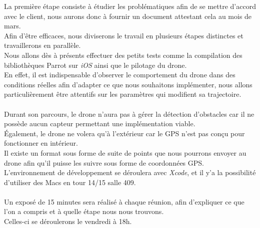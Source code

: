 \documentclass[]{article}
\begin{document}
La première étape consiste à étudier les problématiques afin de se mettre d'accord avec le client, nous aurons donc à fournir un document attestant cela au mois de mars. \\
Afin d'être efficaces, nous diviserons le travail en plusieurs étapes distinctes et travaillerons en parallèle.\\
Nous allons dès à présents effectuer des petits tests comme la compilation des bibliothèques Parrot sur \textit{iOS} ainsi que le pilotage du drone. \\
En effet, il est indispensable d'observer le comportement du drone dans des conditions réelles afin d'adapter ce que nous souhaitons implémenter, nous allons particulièrement être attentifs sur les paramètres qui modifient sa trajectoire. 
\\
\\
Durant son parcours, le drone n'aura pas à gérer la détection d'obstacles car il ne possède aucun capteur permettant une implémentation viable. \\
Également, le drone ne volera  qu'à l'extérieur car le GPS n'est pas conçu pour fonctionner en intérieur.\\
Il existe un format sous forme de suite de points que nous pourrons envoyer au drone afin qu'il puisse les suivre sous forme de coordonnées GPS.\\
L'environnement de développement se déroulera avec \textit{Xcode}, et il y'a la possibilité d'utiliser des Macs en tour 14/15 salle 409.\\
\\
Un exposé de 15 minutes sera réalisé à chaque réunion, afin d'expliquer ce que l'on a compris et à quelle étape nous nous trouvons.\\
Celles-ci se déroulerons le vendredi à 18h.
\end{document}
